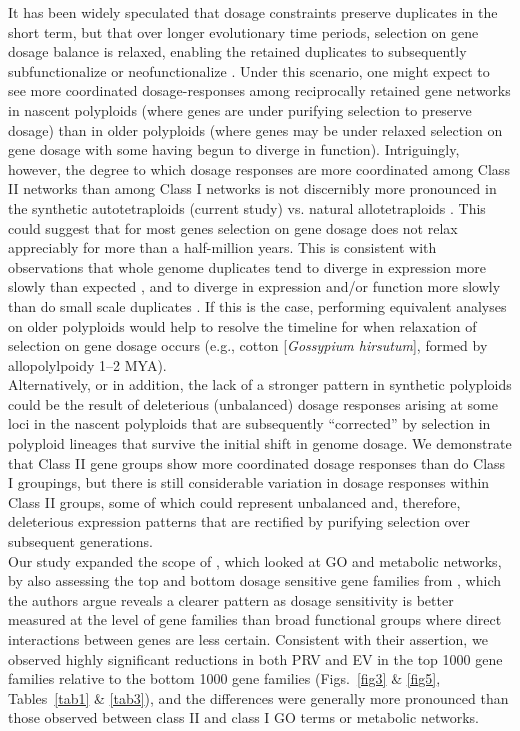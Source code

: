 \documentclass[11pt]{article}
\begin{document}
It has been widely speculated that dosage constraints preserve duplicates in the short term, but that over longer evolutionary time periods, selection on gene dosage balance is relaxed, enabling the retained duplicates to subsequently subfunctionalize or neofunctionalize \citep{coate2011, schnable2012, conant2014, coate2016, gout2015}.
Under this scenario, one might expect to see more coordinated dosage-responses among reciprocally retained gene networks in nascent polyploids (where genes are under purifying selection to preserve dosage) than in older polyploids (where genes may be under relaxed selection on gene dosage with some having begun to diverge in function).
Intriguingly, however, the degree to which dosage responses are more coordinated among Class II networks than among Class I networks is not discernibly more pronounced in the synthetic autotetraploids (current study) vs. natural allotetraploids \citep{coate2016}.
This could suggest that for most genes selection on gene dosage does not relax appreciably for more than a half-million years.
This is consistent with observations that whole genome duplicates tend to diverge in expression more slowly than expected \citep{rodgers2012, tasdighian2017}, and to diverge in expression and/or function more slowly than do small scale duplicates \citep{hakes2007, qiao2018, wang2011, rodgers2012, defoort2019}.
If this is the case, performing equivalent analyses on older polyploids would help to resolve the timeline for when relaxation of selection on gene dosage occurs (e.g., cotton [\textit{Gossypium hirsutum}], formed by allopolylpoidy 1--2 MYA).\\

Alternatively, or in addition, the lack of a stronger pattern in synthetic polyploids could be the result of deleterious (unbalanced) dosage responses arising at some loci in the nascent polyploids that are subsequently ``corrected'' by selection in polyploid lineages that survive the initial shift in genome dosage.
We demonstrate that Class II gene groups show more coordinated dosage responses than do Class I groupings, but there is still considerable variation in dosage responses within Class II groups, some of which could represent unbalanced and, therefore, deleterious expression patterns that are rectified by purifying selection over subsequent generations.\\

Our study expanded the scope of \cite{coate2016}, which looked at GO and metabolic networks, by also assessing the top and bottom dosage sensitive gene families from \cite{tasdighian2017}, which the authors argue reveals a clearer pattern as dosage sensitivity is better measured at the level of gene families than broad functional groups where direct interactions between genes are less certain. Consistent with their assertion, we observed highly significant reductions in both PRV and EV in the top 1000 gene families relative to the bottom 1000 gene families (Figs.~\ref{fig3} \& \ref{fig5}, Tables~\ref{tab1} \& \ref{tab3}), and the differences were generally more pronounced than those observed between class II and class I GO terms or metabolic networks.\\
\end{document}
